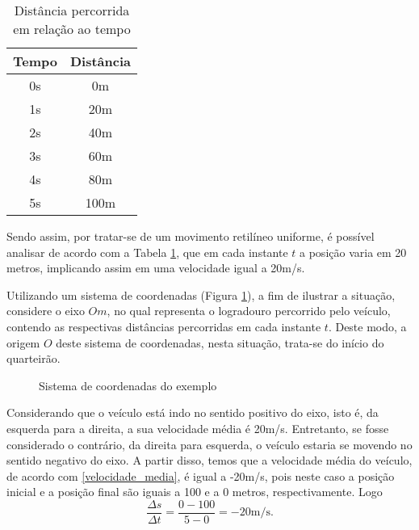 \documentclass[
	12pt,				%
	openright,			%
    twoside,			%
	a4paper,			%
	chapter=TITLE,		%
	english,			%
	french,				%
	spanish,			%
	brazil				%
	]{abntex2}
\numberwithin{lema}{chapter}
\numberwithin{teorema}{chapter}
\numberwithin{definicao}{chapter}
\numberwithin{exemplo}{chapter}
\numberwithin{figure}{chapter}
\begin{document}
\begin{table}[!h]
	\centering
	\caption{Distância percorrida em relação ao tempo}
	\label{tabela_exemplo}
	\begin{tabular}{c|c}
		\hline
		Tempo & Distância \\ \hline
		0s & 0m \\ \hline
		1s & 20m \\ \hline
		2s & 40m \\ \hline
		3s & 60m \\ \hline
		4s & 80m \\ \hline
		5s & 100m \\ \hline	
	\end{tabular}
\end{table}

Sendo assim, por tratar-se de um movimento retilíneo uniforme, é possível analisar de acordo com a Tabela \ref{tabela_exemplo}, que em cada instante $t$ a posição varia em 20 metros, implicando assim em uma velocidade igual a 20m/s.

Utilizando um sistema de coordenadas (Figura \ref{sistema}), a fim de ilustrar a situação, considere o eixo $Om$, no qual representa o logradouro percorrido pelo veículo, contendo as respectivas distâncias percorridas em cada instante $t$. Deste modo, a origem $O$ deste sistema de coordenadas, nesta situação, trata-se do início do quarteirão.  

\begin{figure}[!h]
	\centering
	\caption{Sistema de coordenadas do exemplo}
	\label{sistema}
\end{figure}

Considerando que o veículo está indo no sentido positivo do eixo, isto é, da esquerda para a direita, a sua velocidade média é 20m/s. Entretanto, se fosse considerado o contrário, da direita para esquerda, o veículo estaria se movendo no sentido negativo do eixo. A partir disso, temos que a velocidade média do veículo, de acordo com \ref{velocidade_media}, é igual a -20m/s, pois neste caso a posição inicial e a posição final são iguais a 100 e a 0 metros, respectivamente. Logo
$$\dfrac{\Delta s}{\Delta t} = \dfrac{0 - 100}{5 - 0} = -20\text{m/s}.$$ 
\end{document}
